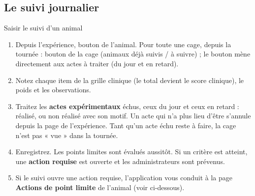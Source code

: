 \documentclass[11pt,a4paper]{article}
\begin{document}
\subsection{Le suivi journalier}
\begin{procedure}{Saisir le suivi d'un animal}
\begin{enumerate}
  \item Depuis l'expérience, bouton  de l'animal. Pour
    toute une cage, depuis la tournée : bouton  de la cage (animaux déjà suivis / à suivre) ; le bouton
     mène directement aux actes à traiter (du jour et en
    retard).
  \item Notez chaque item de la grille clinique (le total devient le score
    clinique), le poids et les observations.
  \item Traitez les \textbf{actes expérimentaux} échus, ceux du jour et
    ceux en retard : réalisé, ou non réalisé avec son motif. Un acte qui
    n'a plus lieu d'être s'annule depuis la page  de
    l'expérience. Tant qu'un acte échu reste à faire, la cage n'est pas
    « vue » dans la tournée.
  \item Enregistrez. Les points limites sont évalués aussitôt. Si un critère
    est atteint, une \textbf{action requise} est ouverte et les
    administrateurs sont prévenus.
  \item Si le suivi ouvre une action requise, l'application vous conduit à
    la page \textbf{Actions de point limite} de l'animal (voir ci-dessous).
\end{enumerate}
\end{procedure}
\end{document}
